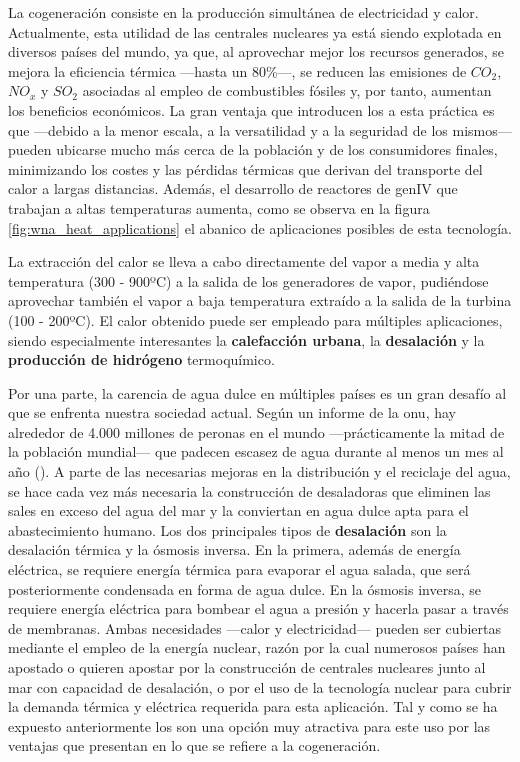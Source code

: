La cogeneración consiste en la producción simultánea de electricidad y calor. Actualmente, esta utilidad de las centrales nucleares ya está siendo explotada en diversos países del mundo, ya que, al aprovechar mejor los recursos generados, se mejora la eficiencia térmica ---hasta un 80\%---, se reducen las emisiones de $CO_2$, $NO_x$ y $SO_2$ asociadas al empleo de combustibles fósiles y, por tanto, aumentan los beneficios económicos. La gran ventaja que introducen los  a esta práctica es que ---debido a la menor escala, a la versatilidad y a la seguridad de los mismos--- pueden ubicarse mucho más cerca de la población y de los consumidores finales, minimizando los costes y las pérdidas térmicas que derivan del transporte del calor a largas distancias. Además, el desarrollo de reactores de \acrshort{genIV} que trabajan a altas temperaturas aumenta, como se observa en la figura \ref{fig:wna_heat_applications} el abanico de aplicaciones posibles de esta tecnología.

La extracción del calor se lleva a cabo directamente del vapor a media y alta temperatura (300 - 900ºC) a la salida de los generadores de vapor, pudiéndose aprovechar también el vapor a baja temperatura extraído a la salida de la turbina (100 - 200ºC). El calor obtenido puede ser empleado para múltiples aplicaciones, siendo especialmente interesantes la \textbf{calefacción urbana}, la \textbf{desalación} y la \textbf{producción de hidrógeno} termoquímico. 

Por una parte, la carencia de agua dulce en múltiples países es un gran desafío al que se enfrenta nuestra sociedad actual. Según un informe de la \acrshort{onu}, hay alrededor de 4.000 millones de peronas en el mundo ---prácticamente la mitad de la población mundial--- que padecen escasez de agua durante al menos un mes al año (\cite{onu_agua}). A parte de las necesarias mejoras en la distribución y el reciclaje del agua, se hace cada vez más necesaria la construcción de desaladoras que eliminen las sales en exceso del agua del mar y la conviertan en agua dulce apta para el abastecimiento humano. Los dos principales tipos de \textbf{desalación} son la desalación térmica y la ósmosis inversa. En la primera, además de energía eléctrica, se requiere energía térmica para evaporar el agua salada, que será posteriormente condensada en forma de agua dulce. En la ósmosis inversa, se requiere energía eléctrica para bombear el agua a presión y hacerla pasar a través de membranas. Ambas necesidades ---calor y electricidad--- pueden ser cubiertas mediante el empleo de la energía nuclear, razón por la cual numerosos países han apostado  o quieren apostar por la construcción de centrales nucleares junto al mar con capacidad de desalación, o por el uso de la tecnología nuclear para cubrir la demanda térmica y eléctrica requerida para esta aplicación. Tal y como se ha expuesto anteriormente los  son una opción muy atractiva para este uso por las ventajas que presentan en lo que se refiere a la cogeneración.

